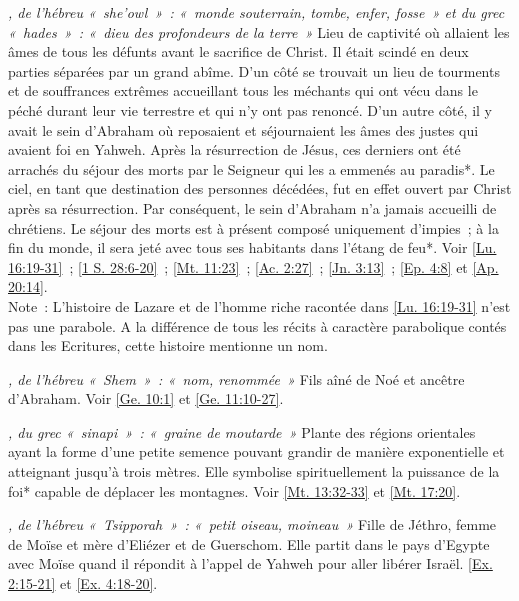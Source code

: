 \begin{multicols}{2}
\textit{, de l'hébreu «~she'owl~»~: «~monde souterrain, tombe, enfer, fosse~» et du grec «~hades~»~: «~dieu des profondeurs de la terre~»}\newline
Lieu de captivité où allaient les âmes de tous les défunts avant le sacrifice de Christ. Il était scindé en deux parties séparées par un grand abîme. D'un côté se trouvait un lieu de tourments et de souffrances extrêmes accueillant tous les méchants qui ont vécu dans le péché durant leur vie terrestre et qui n'y ont pas renoncé. D'un autre côté, il y avait le sein d'Abraham où reposaient et séjournaient les âmes des justes qui avaient foi en Yahweh. Après la résurrection de Jésus, ces derniers ont été arrachés du séjour des morts par le Seigneur qui les a emmenés au paradis*. Le ciel, en tant que destination des personnes décédées, fut en effet ouvert par Christ après sa résurrection. Par conséquent, le sein d'Abraham n'a jamais accueilli de chrétiens. Le séjour des morts est à présent composé uniquement d'impies~; à la fin du monde, il sera jeté avec tous ses habitants dans l'étang de feu*. Voir \vref{Lu. 16:19-31}~; \vref{1 S. 28:6-20}~; \vref{Mt. 11:23}~; \vref{Ac. 2:27}~; \vref{Jn. 3:13}~; \vref{Ep. 4:8} et \vref{Ap. 20:14}.
\\Note~: L'histoire de Lazare et de l'homme riche racontée dans \vref{Lu. 16:19-31} n'est pas une parabole. A la différence de tous les récits à caractère parabolique contés dans les Ecritures, cette histoire mentionne un nom.

\textit{, de l'hébreu «~Shem~»~: «~nom, renommée~»}\newline
Fils aîné de Noé et ancêtre d'Abraham. Voir \vref{Ge. 10:1} et \vref{Ge. 11:10-27}.

\textit{, du grec «~sinapi~»~: «~graine de moutarde~»}\newline
Plante des régions orientales ayant la forme d'une petite semence pouvant grandir de manière exponentielle et atteignant jusqu'à trois mètres. Elle symbolise spirituellement la puissance de la foi* capable de déplacer les montagnes. Voir \vref{Mt. 13:32-33} et \vref{Mt. 17:20}.

\textit{, de l'hébreu «~Tsipporah~»~: «~petit oiseau, moineau~»}\newline
Fille de Jéthro, femme de Moïse et mère d'Eliézer et de Guerschom. Elle partit dans le pays d'Egypte avec Moïse quand il répondit à l'appel de Yahweh pour aller libérer Israël. \vref{Ex. 2:15-21} et \vref{Ex. 4:18-20}.


\end{multicols}
